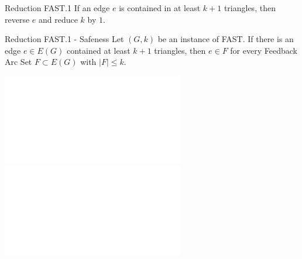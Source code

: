 \documentclass{beamer}
\newcommand{\abs}[1]{\left| #1 \right|}
\begin{document}
	\begin{frame}[fragile]{Reduction FAST.1}
		If an edge \(e\) is contained in at least \(k+1\) triangles, then reverse \(e\) and reduce \(k\) by \(1\). \newline 
		
		\begin{center}
		\end{center}
	\end{frame}
	
	\begin{frame}[fragile]{Reduction FAST.1 - Safeness}
		Let $(G, k)$ be an instance of FAST. If there is an edge $e \in E(G)$ contained at least $k+1$ triangles, then $e \in F$ for every Feedback Arc Set $F \subset E(G)$ with $\abs{F} \leq k$. 
		
		\begin{center}
			\includegraphics<2>[height=0.6\paperheight]{images/FAST_1/FAST1_Safeness1.pdf}
			\includegraphics<3>[height=0.6\paperheight]{images/FAST_1/FAST1_Safeness2.pdf}
		\end{center}
	\end{frame}
	
\end{document}
